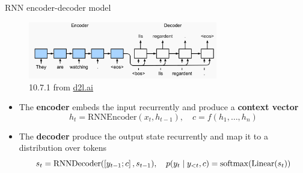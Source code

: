 \documentclass[usenames,dvipsnames,notes,11pt,aspectratio=169,hyperref={colorlinks=true, linkcolor=blue}]{beamer}
\begin{document}
\begin{frame}
    {RNN encoder-decoder model}
    \begin{figure}
        \includegraphics[height=2.5cm]{figures/rnn-enc-dec}
        \caption{10.7.1 from \href{https://d2l.ai/chapter_recurrent-modern/seq2seq.html}{d2l.ai}}
    \end{figure}
    \vspace{-1em}

    \begin{itemize}
        \item The \textbf{encoder} embeds the input recurrently
            and produce a \textbf{context vector}
            $$
            h_t = \mathrm{RNNEncoder}(x_t, h_{t-1}), \quad
            c = f(h_1,\ldots,h_n)
            $$
        \item The \textbf{decoder}  produce the output state {recurrently}
            and map it to a distribution over tokens
            $$s_t = \mathrm{RNNDecoder}(\left[ y_{t-1};c \right], s_{t-1}), \quad
            p(y_t\mid y_{<t}, c) = \mathrm{softmax}(\mathrm{Linear}(s_t))
            $$
    \end{itemize}
\end{frame}
\end{document}
